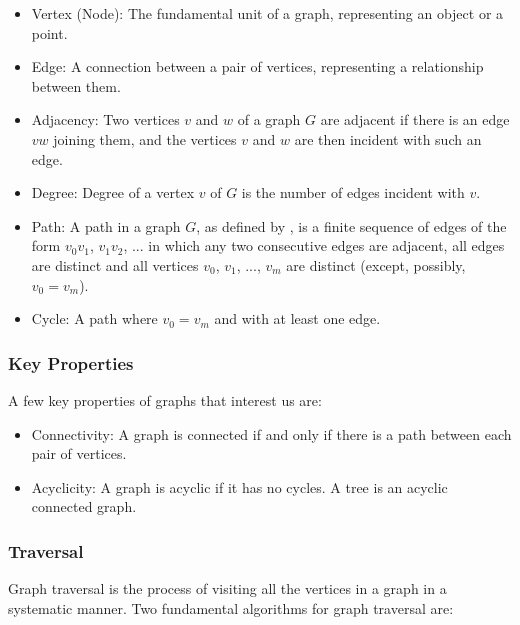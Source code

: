 \begin{itemize}
    \item Vertex (Node): The fundamental unit of a graph, representing an object or a point.
    \item Edge: A connection between a pair of vertices, representing a relationship between them.
    \item Adjacency: Two vertices $v$ and $w$ of a graph $G$ are adjacent if there is an edge $vw$ joining them, and the vertices $v$ and $w$ are then incident with such an edge. \cite{West2018}
    \item Degree: Degree of a vertex $v$ of $G$ is the number of edges incident with $v$. \cite{West2018}
    \item Path: A path in a graph $G$, as defined by , is a finite sequence of edges of the form $v_0v_1$, $v_1v_2$, ... in which any two consecutive edges are adjacent, all edges are distinct and all vertices $v_0$, $v_1$, ..., $v_m$ are distinct (except, possibly, $v_0 = v_m$).
    \item Cycle: A path where $v_0 = v_m$ and with at least one edge. \cite{West2018}
\end{itemize}

\subsubsection{Key Properties}

A few key properties of graphs that interest us are:

\begin{itemize}
    \item Connectivity: A graph is connected if and only if there is a path between each pair of vertices. \cite{West2018}
    \item Acyclicity: A graph is acyclic if it has no cycles. A tree is an acyclic connected graph.
\end{itemize}

\subsubsection{Traversal}

Graph traversal is the process of visiting all the vertices in a graph in a systematic manner. Two fundamental algorithms for graph traversal are:

